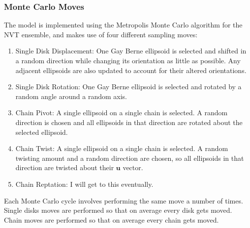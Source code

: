 \documentclass[11pt]{article}
\begin{document}
\subsubsection*{Monte Carlo Moves}
The model is implemented using the Metropolis Monte Carlo algorithm for the NVT ensemble, and makes use of four different sampling moves:
\begin{enumerate}
\item Single Disk Displacement: One Gay Berne ellipsoid is selected and shifted in a random direction while changing its orientation as little as possible. Any adjacent ellipsoids are also updated to account for their altered orientations. 
\item Single Disk Rotation: One Gay Berne ellipsoid is selected and rotated by a random angle around a random axis.
\item Chain Pivot: A single ellipsoid on a single chain is selected. A random direction is chosen and all ellipsoids in that direction are rotated about the selected ellipsoid. 
\item Chain Twist: A single ellipsoid on a single chain is selected. A random twisting amount and a random direction are chosen, so all ellipsoids in that direction are twisted about their $\textbf{u}$ vector.
\item Chain Reptation: I will get to this eventually. 
\end{enumerate}
Each Monte Carlo cycle involves performing the same move a number of times. Single disks moves are performed so that on average every disk gets moved. Chain moves are performed so that on average every chain gets moved.
\end{document}
